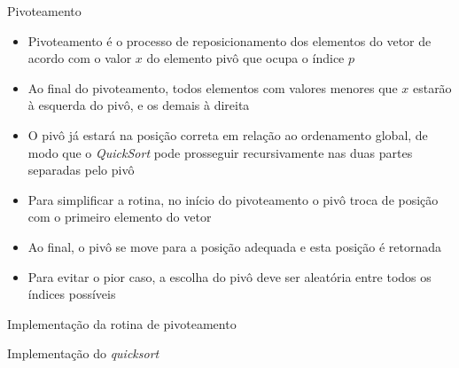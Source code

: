 \begin{frame}[fragile]{Pivoteamento}

    \begin{itemize}
        \item Pivoteamento é o processo de reposicionamento dos elementos do vetor
            de acordo com o valor $x$ do elemento pivô que ocupa o índice $p$

        \item Ao final do pivoteamento, todos elementos com valores menores que $x$ estarão
            à esquerda do pivô, e os demais à direita

        \item O pivô já estará na posição correta em relação ao ordenamento global, de modo que
            o  \textit{QuickSort} pode prosseguir recursivamente nas duas partes separadas
            pelo pivô

        \item Para simplificar a rotina, no início do pivoteamento o pivô troca de posição
            com o primeiro elemento do vetor

        \item Ao final, o pivô se move para a posição adequada e esta posição é retornada

        \item Para evitar o pior caso, a escolha do pivô deve ser aleatória entre todos 
            os índices possíveis
    \end{itemize}

\end{frame}



\begin{frame}[fragile]{Implementação da rotina de pivoteamento}
\end{frame}




\begin{frame}[fragile]{Implementação do {\it quicksort}}
\end{frame}


